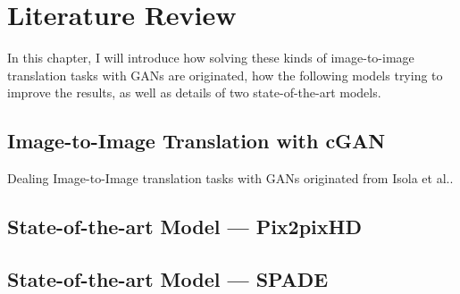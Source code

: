 \chapter{Literature Review}
\label{cha:review}
In this chapter, I will introduce how solving these kinds of image-to-image
translation tasks with GANs are originated, how the following models trying 
to improve the results, as well as details of two state-of-the-art models.

\section{Image-to-Image Translation with cGAN}
Dealing Image-to-Image translation tasks with GANs originated from Isola et al.\cite{pix2pix2016}.
\section{State-of-the-art Model — Pix2pixHD}

\section{State-of-the-art Model — SPADE}



